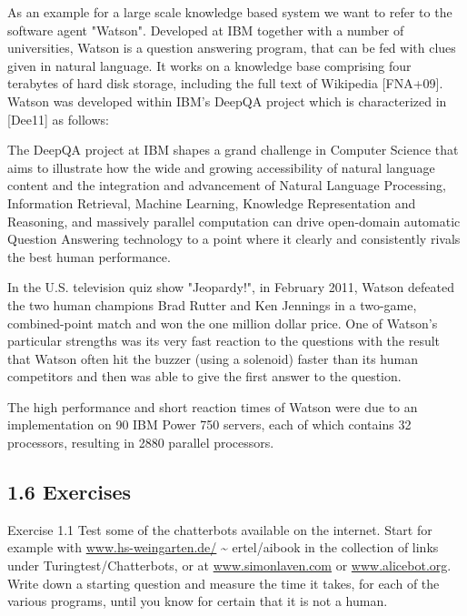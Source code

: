 \documentclass[10pt]{article}
\begin{document}
As an example for a large scale knowledge based system we want to refer to the software agent "Watson". Developed at IBM together with a number of universities, Watson is a question answering program, that can be fed with clues given in natural language. It works on a knowledge base comprising four terabytes of hard disk storage, including the full text of Wikipedia [FNA+09]. Watson was developed within IBM's DeepQA project which is characterized in [Dee11] as follows:

\begin{displayquote}
The DeepQA project at IBM shapes a grand challenge in Computer Science that aims to illustrate how the wide and growing accessibility of natural language content and the integration and advancement of Natural Language Processing, Information Retrieval, Machine Learning, Knowledge Representation and Reasoning, and massively parallel computation can drive open-domain automatic Question Answering technology to a point where it clearly and consistently rivals the best human performance.
\end{displayquote}

In the U.S. television quiz show "Jeopardy!", in February 2011, Watson defeated the two human champions Brad Rutter and Ken Jennings in a two-game, combined-point match and won the one million dollar price. One of Watson's particular strengths was its very fast reaction to the questions with the result that Watson often hit the buzzer (using a solenoid) faster than its human competitors and then was able to give the first answer to the question.

The high performance and short reaction times of Watson were due to an implementation on 90 IBM Power 750 servers, each of which contains 32 processors, resulting in 2880 parallel processors.

\subsection*{1.6 Exercises}
Exercise 1.1 Test some of the chatterbots available on the internet. Start for example with \href{http://www.hs-weingarten.de/}{www.hs-weingarten.de/} \~{} ertel/aibook in the collection of links under Turingtest/Chatterbots, or at \href{http://www.simonlaven.com}{www.simonlaven.com} or \href{http://www.alicebot.org}{www.alicebot.org}. Write down a starting question and measure the time it takes, for each of the various programs, until you know for certain that it is not a human.
\end{document}
